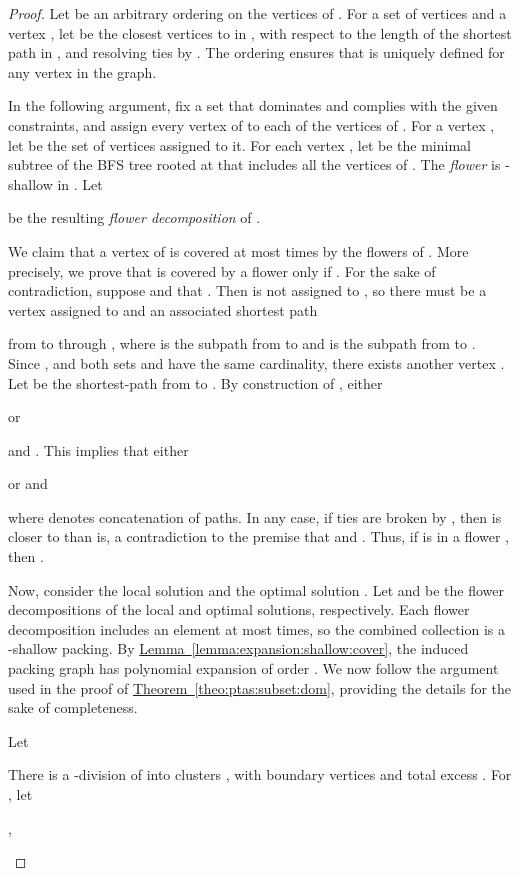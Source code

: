 \documentclass[12pt]{article}
\theoremstyle{remark}\theoremheaderfont{\sf}\theorembodyfont{\upshape}
\numberwithin{figure}{section}\numberwithin{table}{section}\numberwithin{equation}{section}
\newcommand{\HLink}[2]{\hyperref[#2]{#1~\ref*{#2}}}
\newcommand{\lemref}[1]{\HLink{Lemma}{lemma:#1}}
\newcommand{\thmref}[1]{\HLink{Theorem}{theo:#1}}
\begin{document}
\begin{proof}
  Let  be an arbitrary ordering on the vertices of .
  For a set of vertices  and a vertex
  , let  be the  closest
  vertices to  in , with respect to the length of the
  shortest path in , and resolving ties by . The
  ordering  ensures that  is uniquely
  defined for any vertex in the graph.

  In the following argument, fix a set  that
  dominates  and complies with the given constraints, and
  assign every vertex of  to each of the vertices of
  .  For a vertex , let
   be the set of vertices assigned to it.  For each vertex
  , let  be the minimal subtree of the {BFS}
  tree rooted at  that includes all the vertices of
  .  The \emph{flower}
   is -shallow in
  .  Let
  
  be the resulting \emph{flower decomposition} of .

  We claim that a vertex  of  is covered at most
   times by the flowers of . More precisely, we
  prove that  is covered by a flower  only if
  . For the sake of contradiction,
  suppose  and that
  . Then  is not assigned to
  , so there must be a vertex  assigned to  and an associated
  shortest path
  
  from  to  through , where  is the subpath from
   to  and  is the subpath from  to . Since
  , and both sets
   and  have
  the same cardinality, there exists another vertex
  .  Let  be the shortest-path
  from  to . By construction of ,
  either
  
  or
  
  and . This implies that either
  
  or  and
  
  where  denotes concatenation of paths.  In any case, if ties are
  broken by , then  is closer to  than  is, a
  contradiction to the premise that 
  and . Thus, if  is in a
  flower , then .

  Now, consider the local solution  and the optimal solution
  .  Let  and
   be the flower decompositions
  of the local and optimal solutions, respectively. Each flower
  decomposition includes an element at most  times, so the
  combined collection  is a
  -shallow packing. By
  \lemref{expansion:shallow:cover}, the induced packing graph
   has polynomial expansion of
  order .  We now follow the argument used in the proof of
  \thmref{ptas:subset:dom}, providing the details for the sake of
  completeness.

  Let
  
  There is a -division of  into clusters
  , with
   boundary vertices and total excess
  .  For
  , let \smallskip
  \begin{compactenum}[\qquad(i)]
  \item ,


\end{compactenum}
\end{proof}
\end{document}
